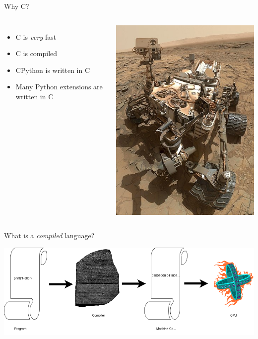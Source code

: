 \documentclass[12pt, aspectration=169]{beamer}
\begin{document}
    \begin{frame}{Why C?}
        \begin{columns}
            \begin{itemize}
                \item C is \textit{very} fast
                \item C is compiled
                \item CPython is written in C
                \item Many Python extensions are written in C
            \end{itemize}
            \includegraphics[scale=0.35]{static/images/390px-Curiosity_Self-Portrait_at_'Big_Sky'_Drilling_Site}
        \end{columns}
    \end{frame}

    \begin{frame}{What is a \textit{compiled} language?}
        \begin{center}
            \includegraphics[scale=0.45]{static/images/compiled.drawio}
        \end{center}
    \end{frame}
\end{document}
